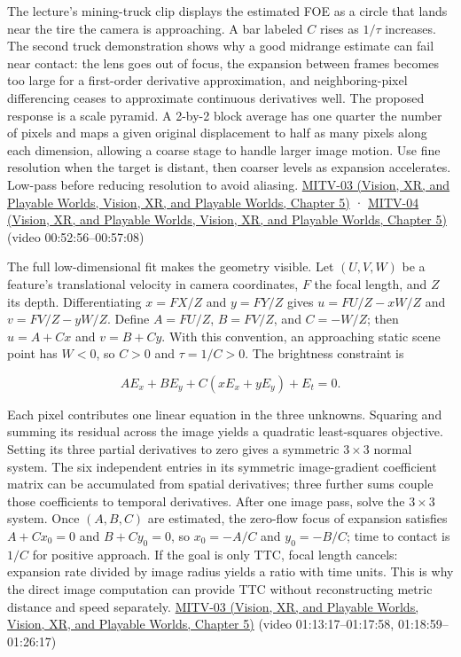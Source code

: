The lecture's mining-truck clip displays the estimated FOE as a circle that lands near the tire the camera is approaching. A bar labeled \(C\) rises as \(1/\tau\) increases. The second truck demonstration shows why a good midrange estimate can fail near contact: the lens goes out of focus, the expansion between frames becomes too large for a first-order derivative approximation, and neighboring-pixel differencing ceases to approximate continuous derivatives well. The proposed response is a scale pyramid. A 2-by-2 block average has one quarter the number of pixels and maps a given original displacement to half as many pixels along each dimension, allowing a coarse stage to handle larger image motion. Use fine resolution when the target is distant, then coarser levels as expansion accelerates. Low-pass before reducing resolution to avoid aliasing. \href{../07-Vision-XR-and-Playable-Worlds/main.pdf\#nameddest=04-visual-computing-ii-ch036-mitv-03---time-to-contact-focus-of-expansion-direct-motion-vision-methods-noise-gain}{MITV-03 (Vision, XR, and Playable Worlds, Vision, XR, and Playable Worlds, Chapter 5)} · \href{../07-Vision-XR-and-Playable-Worlds/main.pdf\#nameddest=04-visual-computing-ii-ch036-mitv-04---fixed-optical-flow-optical-mouse-constant-brightness-assumption-closed-form-solution}{MITV-04 (Vision, XR, and Playable Worlds, Vision, XR, and Playable Worlds, Chapter 5)} (video 00:52:56--00:57:08)

The full low-dimensional fit makes the geometry visible. Let \((U,V,W)\) be a feature's translational velocity in camera coordinates, \(F\) the focal length, and \(Z\) its depth. Differentiating \(x=FX/Z\) and \(y=FY/Z\) gives \(u=FU/Z-xW/Z\) and \(v=FV/Z-yW/Z\). Define \(A=FU/Z\), \(B=FV/Z\), and \(C=-W/Z\); then \(u=A+Cx\) and \(v=B+Cy\). With this convention, an approaching static scene point has \(W<0\), so \(C>0\) and \(\tau=1/C>0\). The brightness constraint is

\[
AE_x+BE_y+C(xE_x+yE_y)+E_t=0.
\]

Each pixel contributes one linear equation in the three unknowns. Squaring and summing its residual across the image yields a quadratic least-squares objective. Setting its three partial derivatives to zero gives a symmetric \(3\times3\) normal system. The six independent entries in its symmetric image-gradient coefficient matrix can be accumulated from spatial derivatives; three further sums couple those coefficients to temporal derivatives. After one image pass, solve the \(3\times3\) system. Once \((A,B,C)\) are estimated, the zero-flow focus of expansion satisfies \(A+Cx_0=0\) and \(B+Cy_0=0\), so \(x_0=-A/C\) and \(y_0=-B/C\); time to contact is \(1/C\) for positive approach. If the goal is only TTC, focal length cancels: expansion rate divided by image radius yields a ratio with time units. This is why the direct image computation can provide TTC without reconstructing metric distance and speed separately. \href{../07-Vision-XR-and-Playable-Worlds/main.pdf\#nameddest=04-visual-computing-ii-ch036-mitv-03---time-to-contact-focus-of-expansion-direct-motion-vision-methods-noise-gain}{MITV-03 (Vision, XR, and Playable Worlds, Vision, XR, and Playable Worlds, Chapter 5)} (video 01:13:17--01:17:58, 01:18:59--01:26:17)

